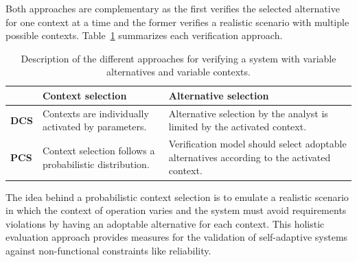 Both approaches are complementary as the first verifies the selected alternative for one context at a time and the former verifies a realistic scenario with multiple possible contexts. Table~\ref{tab:SC_DCA_PCA} summarizes each verification approach.

\begin{table}[h]
{\renewcommand{\arraystretch}{2.5}
\begin{tabularx}{\textwidth}{@{}l|XX@{}}
\toprule
			 &                                                         \textbf{Context selection}			 &                                                                                                      \textbf{Alternative selection}			\\ \midrule
\textbf{DCS} & Contexts are individually activated by parameters.  & Alternative selection by the analyst is limited by the activated context.                                                                                    \\
\textbf{PCS} & Context selection follows a probabilistic distribution. & Verification model should select adoptable alternatives according to the activated context.\\ \bottomrule
\end{tabularx}
}
\caption{Description of the different approaches for verifying a system with variable alternatives and variable contexts.}
\label{tab:SC_DCA_PCA}
\end{table}


The idea behind a probabilistic context selection is to emulate a realistic scenario in which the context of operation varies and the system must avoid requirements violations by  having an adoptable alternative for each context. This holistic evaluation approach provides measures for the validation of self-adaptive systems against non-functional constraints like reliability.

